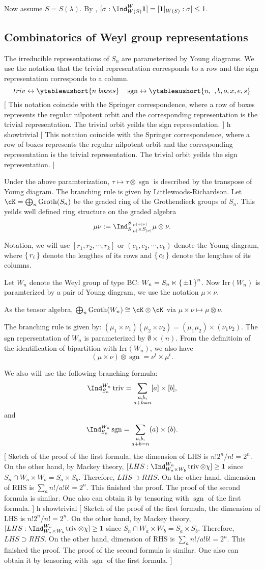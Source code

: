 \documentclass[12pt,a4paper]{amsart}
\newcommand{\trivial}[2][]{\if\relax\detokenize{#1}\relax
  {%
      \color{orange} \vspace{0em} $[$  #2 $]$
      \color{black}
  }
  \else
\ifx#1h
\ifcsname showtrivial\endcsname
{%
    \color{orange} \vspace{0em}  $[$ #2 $]$
    \color{black}
}
\fi
\else {\red Wrong argument!} \fi
\fi
}
\newcommand{\bfone}{\mathbf{1}}
\newcommand{\sgn}{\operatorname{sgn}}
\newcommand{\triv}{\operatorname{triv}}
\numberwithin{equation}{section}
\theoremstyle{remark}
\def\Groth{\mathrm{Groth}}
\def\Irr{\mathrm{Irr}}
\begin{document}
Now assume $S=S(\lambda)$. By \cite[Cor~5.30 b) and c)]{BVUni},
$[\sigma: \Ind_{W(S)}^{W}\bfone]=[\bfone|_{W(S)}:\sigma]\leq 1$.

\subsection{Combinatorics of Weyl group representations}
The irreducible representations of $S_n$ are parameterized by Young diagrams.
We use the notation that the trivial representation corresponds to a row and the
sign representation corresponds to a column.
\[
  triv \leftrightarrow \ytableaushort{n \ b o x e s} \quad \sgn \leftrightarrow
  \ytableaushort{n,\ ,b,o,x,e,s}
\]
\trivial{ This notation coincide with the Springer correspondence, where a row
  of boxes represents the regular nilpotent orbit and the corresponding
  representation is the trivial representation.  The trivial orbit yeilds the
  sign representation.  }

Under the above paramterization, $\tau\mapsto \tau\otimes \sgn$ is described by
the transpose of Young diagram. The branching rule is given by
Littlewoods-Richardson.  Let $\cK = \bigoplus_n \Groth(S_n)$ be the graded ring
of the Grothendieck groups of $S_n$.  This yeilds well defined ring structure on
the graded algebra
\[
  \mu \nu :=\Ind_{S_{|\mu|}\times S_{|\nu|}}^{S_{|\mu|+|\nu|}}\mu\otimes \nu.
\]

Notation, we will use $[r_1, r_2, \cdots, r_k]$ or $(c_1,c_2, \cdots, c_k)$
denote the Young diagram, where $\set{r_i}$ denote the lengthes of its rows and
$\set{c_i}$ denote the lengthes of its columns.

Let $W_n$ denote the Weyl group of type BC: $W_n = S_n \ltimes \set{\pm 1}^n$.
Now $\Irr(W_n)$ is paramterized by a pair of Young diagram, we use the notation
$\mu\times \nu$.

As the tensor algebra, $\bigoplus_n \Groth(W_n)\cong \cK\otimes \cK$ via
$\mu\times \nu \mapsto \mu \otimes \nu$.

The branching rule is given by:
$(\mu_1\times \nu_1)(\mu_2\times \nu_2) = (\mu_1\mu_2)\times (\nu_1 \nu_2)$.
The sgn repersentation of $W_n$ is parameterized by $\emptyset\times (n)$.  From
the definitioin of the identification of bipartition with $\Irr(W_n)$, we also
have
\[
  (\mu\times \nu) \otimes \sgn = \nu^t\times \mu^t.
\]

We also will use the following branching formula:
\[
  \Ind_{S_n}^{W_n} \triv = \sum_{\substack{a,b,\\ a+b=n}} [a]\times [b],
\]
and
\begin{equation}\label{eq:SW2}
  \Ind_{S_n}^{W_n} \sgn = \sum_{\substack{a,b,\\ a+b=n}}
  (a)\times (b).
\end{equation}
\trivial{ Sketch of the proof of the first formula, the dimension of LHS is
  $n!2^n/n! = 2^n$.  On the other hand, by Mackey theory,
  $[LHS:\Ind_{W_a\times W_b}^{W_n} \triv \otimes \chi ] \geq 1$ since
  $S_n\cap W_a\times W_b = S_a\times S_b$.  Therefore, $LHS\supset RHS$.  On the
  other hand, dimension of RHS is $\sum_{a} n!/a!b! = 2^n$.  This finished the
  proof.  The proof of the second formula is similar. One also can obtain it by
  tensoring with $\sgn$ of the first formula.  }
\end{document}
